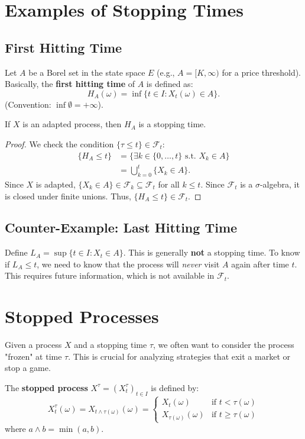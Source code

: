 \section{Examples of Stopping Times}

\subsection{First Hitting Time}
Let $A$ be a Borel set in the state space $E$ (e.g., $A = [K, \infty)$ for a price threshold).
Basically, the \textbf{first hitting time} of $A$ is defined as:
\[
H_A(\omega) = \inf \{ t \in I : X_t(\omega) \in A \}.
\]
(Convention: $\inf \emptyset = +\infty$).

\begin{proposition}
If $X$ is an adapted process, then $H_A$ is a stopping time.
\end{proposition}
\begin{proof}
We check the condition $\{\tau \le t\} \in \mathcal{F}_t$:
\begin{align*}
\{H_A \le t\} &= \{ \exists k \in \{0, \dots, t\} \text{ s.t. } X_k \in A \} \\
&= \bigcup_{k=0}^t \{ X_k \in A \}.
\end{align*}
Since $X$ is adapted, $\{ X_k \in A \} \in \mathcal{F}_k \subseteq \mathcal{F}_t$ for all $k \le t$.
Since $\mathcal{F}_t$ is a $\sigma$-algebra, it is closed under finite unions. Thus, $\{H_A \le t\} \in \mathcal{F}_t$.
\end{proof}

\subsection{Counter-Example: Last Hitting Time}
Define $L_A = \sup \{ t \in I : X_t \in A \}$. This is generally \textbf{not} a stopping time.
To know if $L_A \le t$, we need to know that the process will \textit{never} visit $A$ again after time $t$. This requires future information, which is not available in $\mathcal{F}_t$.

\section{Stopped Processes}

Given a process $X$ and a stopping time $\tau$, we often want to consider the process "frozen" at time $\tau$. This is crucial for analyzing strategies that exit a market or stop a game.

\begin{definition}
The \textbf{stopped process} $X^\tau = (X^\tau_t)_{t \in I}$ is defined by:
\[
X^\tau_t(\omega) = X_{t \wedge \tau(\omega)}(\omega) = \begin{cases}
X_t(\omega) & \text{if } t < \tau(\omega) \\
X_{\tau(\omega)}(\omega) & \text{if } t \ge \tau(\omega)
\end{cases}
\]
where $a \wedge b = \min(a, b)$.
\end{definition}

